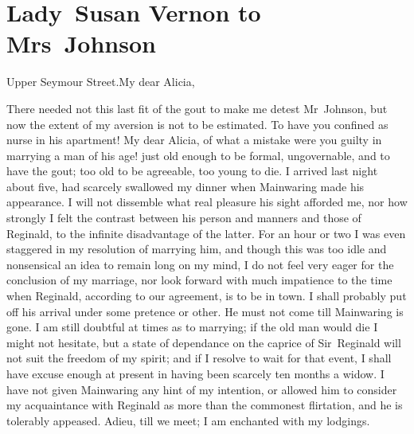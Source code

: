 \chapter{Lady~Susan Vernon to Mrs~Johnson}
  
  \begin{mail}{Upper Seymour Street.}{My dear Alicia,}
  
 There needed not this last fit of the gout to make me detest Mr~Johnson, but now the extent of my aversion is not to be estimated. To have you confined as nurse in his apartment! My dear Alicia, of what a mistake were you guilty in marrying a man of his age! just old enough to be formal, ungovernable, and to have the gout; too old to be agreeable, too young to die. I arrived last night about five, had scarcely swallowed my dinner when Mainwaring made his appearance. I will not dissemble what real pleasure his sight afforded me, nor how strongly I felt the contrast between his person and manners and those of Reginald, to the infinite disadvantage of the latter. For an hour or two I was even staggered in my resolution of marrying him, and though this was too idle and nonsensical an idea to remain long on my mind, I do not feel very eager for the conclusion of my marriage, nor look forward with much impatience to the time when Reginald, according to our agreement, is to be in town. I shall probably put off his arrival under some pretence or other. He must not come till Mainwaring is gone. I am still doubtful at times as to marrying; if the old man would die I might not hesitate, but a state of dependance on the caprice of Sir~Reginald will not suit the freedom of my spirit; and if I resolve to wait for that event, I shall have excuse enough at present in having been scarcely ten months a widow. I have not given Mainwaring any hint of my intention, or allowed him to consider my acquaintance with Reginald as more than the commonest flirtation, and he is tolerably appeased. Adieu, till we meet; I am enchanted with my lodgings. 

\end{mail}